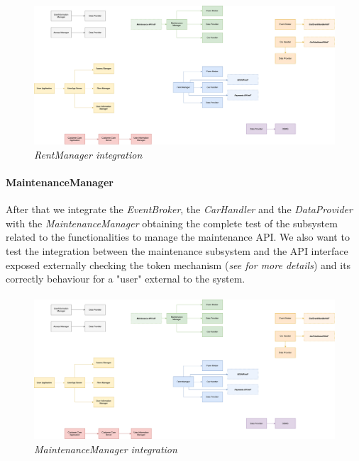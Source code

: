 \paragraph{}
		
		\begin{figure}[h]
			\centering
			\includegraphics[width=0.8\linewidth]{img/Integration3a}
			\caption{
				\label{fig:rentManager} 
				\emph{RentManager integration}
			}
		\end{figure}

\paragraph{MaintenanceManager} 
After that we integrate the \emph{EventBroker}, the \emph{CarHandler} and the \emph{DataProvider} with the \emph{MaintenanceManager} obtaining the complete test of the subsystem related to the functionalities to manage the maintenance API. We also want to test the integration between the maintenance subsystem and the API interface exposed externally checking the token mechanism (\emph{see \cite{DD} for more details}) and its correctly behaviour for a "user" external to the system.
\paragraph{}
		
		\begin{figure}[h]
			\centering
			\includegraphics[width=0.8\linewidth]{img/Integration3b}
			\caption{
				\label{fig:maintenanceManager} 
				\emph{MaintenanceManager integration}
			}
		\end{figure}
		
